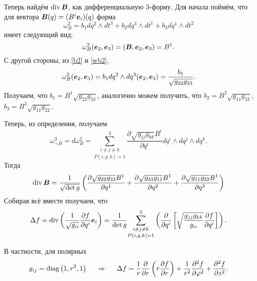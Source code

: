 Теперь найдём $\mathop{\mathrm{div}}\nolimits \mbox{\boldmath $B$}$, как дифференциальную 3-форму. Для начала поймём, что для вектора $\mbox{\boldmath $B$} (q) = (B^i \mbox{\boldmath $e$}_i) (q)$ форма
\begin{equation}
\label{wb2}
    \omega^2_{B} = b_1 dq^2 \wedge dt^3 + b_2 dq^3 \wedge dt^1 + b_3 dq^1 \wedge dt^2
\end{equation}
имеет следующий вид:
$$
    \omega^2_B (\mbox{\boldmath $e$}_2, \mbox{\boldmath $e$}_3) = (\mbox{\boldmath $B$}, \mbox{\boldmath $e$}_2, \mbox{\boldmath $e$}_3) = B^1.
$$
С другой стороны, из \eqref{b2} и \eqref{wb2},
$$
    \omega^2_B (\mbox{\boldmath $e$}_2, \mbox{\boldmath $e$}_3) =
    b_1 dq^2 \wedge dq^3 (\mbox{\boldmath $e$}_2, \mbox{\boldmath $e$}_3) = \frac{b_1}{\sqrt{g_{22} g_{33}}}.
$$
Получаем, что $b_1 = B^1 \sqrt{g_{22} g_{33}}$, аналогично можем получить, что
$b_2 = B^2 \sqrt{g_{11} g_{33}}$, $b_3 = B^3 \sqrt{g_{11} g_{22}}$.

Теперь, из определения, получаем
$$
    \omega^3_{\div B} = d \omega^2_B = 
    \underset{P(i,g,k)=1}{\sum_{i \neq j \neq k}^3}
    \frac{\partial \sqrt{g_{jj} g_{kk}} B^i}{\partial q^i}
    dq^i \wedge dq^j \wedge dq^k.
$$
Тогда
\begin{equation}
\label{div}
    \mathop{\mathrm{div}}\nolimits \mbox{\boldmath $B$} = \frac{1}{\sqrt{\det g}} 
    \left(
        \frac{\partial \sqrt{g_{22} g_{33}} B^1}{\partial q^1} +
        \frac{\partial \sqrt{g_{33} g_{11}} B^1}{\partial q^2} +
        \frac{\partial \sqrt{g_{11} g_{22}} B^1}{\partial q^3} 
    \right)
\end{equation}
Собирая всё вместе получаем, что
\begin{equation}
    \Delta f = \mathop{\mathrm{div}}\nolimits
    \left(
        \frac{1}{\sqrt{g_{ii}}}  \frac{\partial f}{\partial q^i} \mbox{\boldmath $e$}_i
    \right) =
    \frac{1}{\det g} 
    \underset{P(i,g,k)=1}{\sum_{i \neq j \neq k}^3}
    \left(
        \frac{\partial }{\partial q^i} \left[
            \sqrt{\frac{g_{jj} g_{kk}}{g_{ii}} } \frac{\partial f}{\partial q^i} 
        \right] 
    \right).
\end{equation}

В частности, для полярных
$$
    g_{ij} = \mathop{\mathrm{diag}}\nolimits\left(1, r^2, 1\right)
    \hspace{0.5cm} \Rightarrow \hspace{0.5cm} 
        \Delta f = \frac{1}{r} \frac{\partial }{\partial r} 
    \left(r \frac{\partial f}{\partial r} \right) +
    \frac{1}{r^2} \frac{\partial^2 f}{\partial \varphi^2}  + \frac{\partial^2 f}{\partial z^2} .
$$




